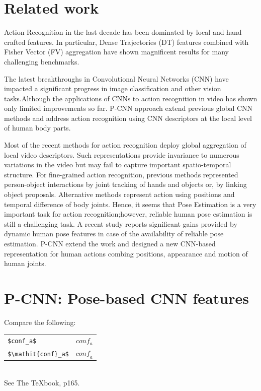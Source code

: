\documentclass[10pt,twocolumn,letterpaper]{article}
\begin{document}
\section{Related work}
\label{related-work}
Action Recognition in the last decade has been dominated by local and hand crafted features. In particular, Dense Trajectories (DT) features\cite{wang2013action} combined with Fisher Vector (FV)\cite{perronnin2010improving} aggregation have shown magnificent results for many challenging benchmarks.

The latest breakthroughs in Convolutional Neural Networks (CNN) have impacted a significant progress in image classification and other vision tasks.Although the applications of CNNs to action recognition in video\cite{simonyan2014two,yue2015beyond} has shown only limited improvements so far. P-CNN approach extend previous global CNN methods and address action recognition using CNN descriptors at the local level of human body parts.

Most of the recent methods for action recognition deploy global aggregation of local video descriptors. Such representations provide invariance to numerous variations
in the video but may fail to capture important spatio-temporal structure. For fine-grained action recognition, previous methods represented person-object interactions by joint tracking of hands and objects\cite{ni2014multiple} or, by linking
object proposals\cite{zhou2015interaction}. Alternative methods represent action using positions and temporal difference of body joints. Hence, it seems that Pose Estimation is a very important task for action recognition;however, reliable human pose estimation is still a challenging task. A recent study \cite{jhuang2013towards} reports significant gains provided by dynamic human pose features in case of the availability of reliable pose estimation. P-CNN extend the work \cite{jhuang2013towards} and designed a new CNN-based representation for human actions combing positions, appearance and motion of human joints.

\section{P-CNN: Pose-based CNN features}
\label{pcnn-features}
\noindent
Compare the following:\\
\begin{tabular}{ll}
 \verb'$conf_a$' &  $conf_a$ \\
 \verb'$\mathit{conf}_a$' & $\mathit{conf}_a$
\end{tabular}\\
See The \TeX book, p165.
\end{document}
